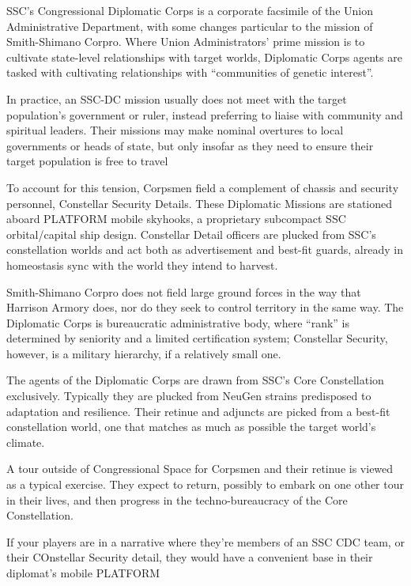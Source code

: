 SSC’s Congressional Diplomatic Corps is a corporate facsimile of the Union Administrative
Department, with some changes particular to the mission of Smith-Shimano Corpro. Where Union
Administrators’ prime mission is to cultivate state-level relationships with target worlds, Diplomatic
Corps agents are tasked with cultivating relationships with “communities of genetic interest”.

In practice, an SSC-DC mission usually does not meet with the target population’s government or
ruler, instead preferring to liaise with community and spiritual leaders. Their missions may make
nominal overtures to local governments or heads of state, but only insofar as they need to ensure
their target population is free to travel

To account for this tension, Corpsmen field a complement of chassis and security personnel,
Constellar Security Details. These Diplomatic Missions are stationed aboard PLATFORM mobile
skyhooks, a proprietary subcompact SSC orbital/capital ship design. Constellar Detail officers are
plucked from SSC’s constellation worlds and act both as advertisement and best-fit guards,
already in homeostasis sync with the world they intend to harvest.

Smith-Shimano Corpro does not field large ground forces in the way that Harrison Armory does,
nor do they seek to control territory in the same way. The Diplomatic Corps is bureaucratic
administrative body, where “rank” is determined by seniority and a limited certification system;
Constellar Security, however, is a military hierarchy, if a relatively small one.

The agents of the Diplomatic Corps are drawn from SSC’s Core Constellation exclusively.
Typically they are plucked from NeuGen strains predisposed to adaptation and resilience. Their
retinue and adjuncts are picked from a best-fit constellation world, one that matches as much as
possible the target world’s climate.

A tour outside of Congressional Space for Corpsmen and their retinue is viewed as a typical
exercise. They expect to return, possibly to embark on one other tour in their lives, and then
progress in the techno-bureaucracy of the Core Constellation.

If your players are in a narrative where they’re members of an SSC CDC team, or their COnstellar
Security detail, they would have  a convenient base in their diplomat’s mobile PLATFORM




